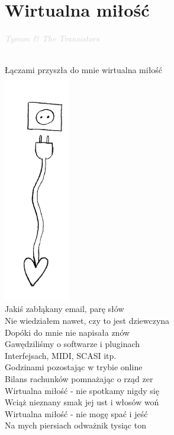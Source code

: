 \documentclass[a5paper, 10pt]{book}
\begin{document}
\section{Wirtualna miłość}\textcolor{lightgray}{\textit{Tymon \& The Transistors}}\\~\\
\begin{minipage}[t]{0.8\textwidth}
  Łączami przyszła do mnie wirtualna miłość\\
  \includegraphics[height=10cm, right]{wirtualna_milosc.png}\vspace*{-10.1cm}\\
  Jakiś zabłąkany email, parę słów\\
  Nie wiedziałem nawet, czy to jest dziewczyna\\
  Dopóki do mnie nie napisała znów\\
  Gawędziliśmy o softwarze i pluginach\\
  Interfejsach, MIDI, SCASI itp.\\
  Godzinami pozostając w trybie online\\
  Bilans rachunków pomnażając o rząd zer\\

  \hspace*{5mm}Wirtualna miłość - nie spotkamy nigdy się\\
  \hspace*{5mm}Wciąż nieznany smak jej ust i włosów woń\\
  \hspace*{5mm}Wirtualna miłość - nie mogę spać i jeść\\
  \hspace*{5mm}Na mych piersiach odważnik tysiąc ton\\


\end{minipage}
\end{document}
